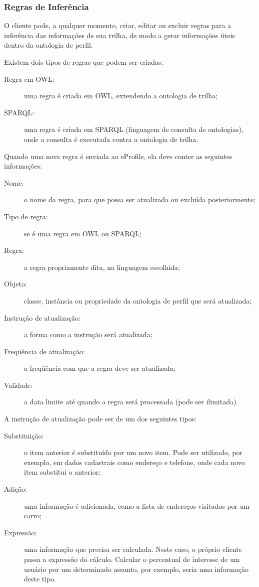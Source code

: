 \subsubsection{Regras de Inferência}

O cliente pode, a qualquer momento, criar, editar ou excluir regras para a inferência das informações de sua trilha, de modo a gerar informações úteis dentro da ontologia de perfil.

Existem dois tipos de regras que podem ser criadas:

\begin{description}

  \item[Regra em OWL:] uma regra é criada em OWL, extendendo a ontologia de trilha;

  \item[SPARQL:] uma regra é criada em SPARQL (linguagem de consulta de ontologias\cite{sparql}), onde a consulta é executada contra a ontologia de trilha.

\end{description}

Quando uma nova regra é enviada ao eProfile, ela deve conter as seguintes informações:

\begin{description}
  \item[Nome:] o nome da regra, para que possa ser atualizada ou excluída posteriormente;
  \item[Tipo de regra:] se é uma regra em OWL ou SPARQL;
  \item[Regra:] a regra propriamente dita, na linguagem escolhida;
  \item[Objeto:] classe, instância ou propriedade da ontologia de perfil que será atualizada;
  \item[Instrução de atualização:] a forma como a instrução será atualizada;
  \item[Freqüência de atualização:] a freqüência com que a regra deve ser atualizada;
  \item[Validade:] a data limite até quando a regra será processada (pode ser ilimitada).
\end{description}

A instrução de atualização pode ser de um dos seguintes tipos:

\begin{description}

  \item[Substituição:] o item anterior é substituído por um novo item. Pode ser utilizado, por exemplo, em dados cadastrais como endereço e telefone, onde cada novo item substitui o anterior;

  \item[Adição:] uma informação é adicionada, como a lista de endereços visitados por um carro;

  \item[Expressão:] uma informação que precisa ser calculada. Neste caso, o próprio cliente passa a expressão do cálculo. Calcular o percentual de interesse de um usuário por um determinado assunto, por exemplo, seria uma informação deste tipo.

\end{description}

